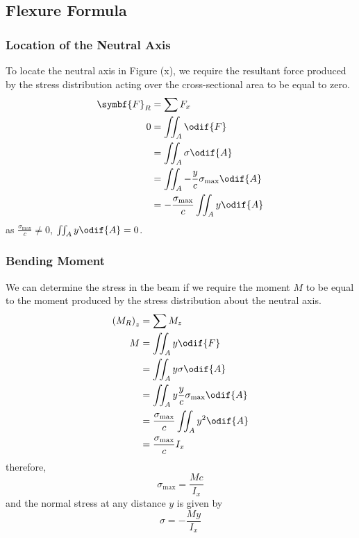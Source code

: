 \documentclass{article}
\begin{document}
\subsection{Flexure Formula}
\subsubsection{Location of the Neutral Axis}
To locate the neutral axis in Figure (x), we require the resultant force produced by the stress distribution
acting over the cross-sectional area to be equal to zero.
\begin{align*}
    \symbf{F}_R & = \sum F_x                                           \\
    0           & = \iint_A \odif{F}                                   \\
                & = \iint_A \sigma \odif{A}                            \\
                & = \iint_A -\frac{y}{c} \sigma_{\text{max}} \odif{A}  \\
                & = - \frac{\sigma_{\text{max}}}{c} \iint_A y \odif{A}
\end{align*}
as \(\frac{\sigma_{\text{max}}}{c} \neq 0\), \(\iint_A y \odif{A} = 0\).
\subsubsection{Bending Moment}
We can determine the stress in the beam if we
require the moment \(M\) to be equal to the moment produced by the stress
distribution about the neutral axis.
\begin{align*}
    \left( M_R \right)_z & = \sum M_z                                             \\
    M                    & = \iint_A y \odif{F}                                   \\
                         & = \iint_A y \sigma \odif{A}                            \\
                         & = \iint_A y \frac{y}{c} \sigma_{\text{max}} \odif{A}  \\
                         & = \frac{\sigma_{\text{max}}}{c} \iint_A y^2 \odif{A} \\
                         & = \frac{\sigma_{\text{max}}}{c} I_x 
\end{align*}
therefore, 
\begin{equation*}
    \sigma_{\text{max}} = \frac{M c}{I_x}
\end{equation*}
and the normal stress at any distance \(y\) is given by
\begin{equation*}
    \sigma = -\frac{M y}{I_x}
\end{equation*}
\end{document}

